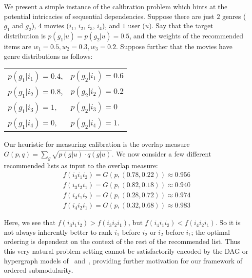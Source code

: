 We present a simple instance of the calibration problem which hints at the potential intricacies of sequential dependencies. Suppose there are just $2$ genres ($g_1$ and $g_2$), $4$ movies ($i_1$, $i_2$, $i_3$, $i_4$), and $1$ user ($u$). Say that the target distribution is $p(g_1 | u) = p(g_2 | u) = 0.5$, and the weights of the recommended items are $w_1 = 0.5, w_2 = 0.3, w_3 = 0.2$. Suppose further that the movies have genre distributions as follows:

\begin{center}
\begin{tabular}{ p{3cm} p{3cm} }
$p(g_1 | i_1) = 0.4$, & $p(g_2 | i_1) = 0.6$ \\[6pt]
$p(g_1 | i_2) = 0.8$, & $p(g_2 | i_2) = 0.2$ \\[6pt]
$p(g_1 | i_3) = 1$, & $p(g_2 | i_3) = 0$ \\[6pt]
$p(g_1 | i_4) = 0$, & $p(g_2 | i_4) = 1$.
\end{tabular}
\end{center}

Our heuristic for measuring calibration is the overlap measure $G(p,q) = \sum_g \sqrt{p(g|u) \cdot q(g|u)}$. We now consider a few different recommended lists as input to the overlap measure:
\begin{align*}
    f(i_3 i_1 i_2) = G(p, (0.78,0.22)) \approx 0.956 \\
    f(i_3 i_2 i_1) = G(p, (0.82,0.18)) \approx 0.940 \\
    f(i_4 i_1 i_2) = G(p, (0.28,0.72)) \approx 0.974 \\
    f(i_4 i_2 i_1) = G(p, (0.32,0.68)) \approx 0.983 
\end{align*}

Here, we see that $f(i_3 i_1 i_2) > f(i_3 i_2 i_1)$, but $f(i_4 i_1 i_2) < f(i_4 i_2 i_1)$. So it is not always inherently better to rank $i_1$ before $i_2$ or $i_2$ before $i_1$; the optimal ordering is dependent on the context of the rest of the recommended list. Thus this very natural problem setting cannot be satisfactorily encoded by the DAG or hypergraph models of~\cite{Tschiatschek2017} and~\cite{Mitrovic18}, providing further motivation for our framework of ordered submodularity. 
%